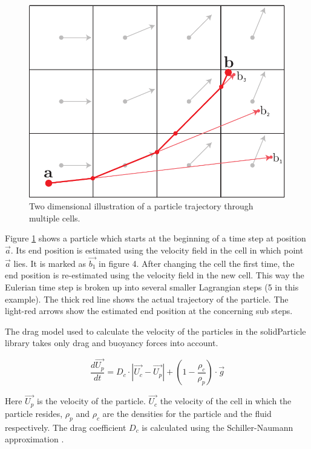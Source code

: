 \begin{figure}[H]
  \centering
  \includegraphics[scale=0.5]{content/gfx/lagrangianSteps.pdf}
  \caption{Two dimensional illustration of a particle trajectory through multiple cells.}
  \label{gfx:lagrangianSteps}
\end{figure}

Figure \ref{gfx:lagrangianSteps} shows a particle which starts at the beginning of a time step at position $\vec{a}$. Its end position is estimated using the velocity field in the cell in which point $\vec{a}$ lies. It is marked as $\vec{b_1}$ in figure 4. After changing the cell the first time, the end position is re-estimated using the velocity field in the new cell. This way the Eulerian time step is broken up into several smaller Lagrangian steps (5 in this example). The thick red line shows the actual trajectory of the particle. The light-red arrows show the estimated end position at the concerning sub steps.

The drag model used to calculate the velocity of the particles in the solidParticle library takes only drag and buoyancy forces into account.

\begin{equation}
    \label{eq:solidParticleVelocity}
    \frac{d \vec{U_p}}{dt} = D_c \cdot | \vec{U_{c}} - \vec{U_{p}} |
        + (1 - \frac{\rho_c}{\rho_p}) \cdot \vec{g}
\end{equation}

Here $\vec{U_p}$ is the velocity of the particle. $\vec{U_c}$ the velocity of the cell in which the particle resides, $\rho_p$ and $\rho_c$ are the densities for the particle and the fluid respectively. The drag coefficient $D_c$ is calculated using the Schiller-Naumann approximation \cite{schillerNaumann}.

